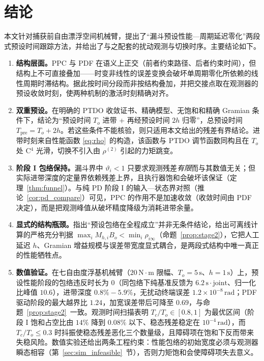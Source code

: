 \section{结论}
\label{sec:conclusion}

本文针对捕获前自由漂浮空间机械臂，提出了“漏斗预设性能—周期延迟零化”两段式预设时间跟踪方法，并给出了与之配套的扰动观测与切换时序。主要结论如下。

\begin{enumerate}
  \item \textbf{结构层面。}PPC 与 PDF 在语义上正交（前者约束路径、后者约束时间），但结构上不可直接叠加——时变非线性的误差变换会破坏单周期零化所依赖的线性周期时滞结构。据此按时间分段而非按结构叠加，并把交接点取在观测器的预设收敛时刻，使两种机制的激活时刻精确对齐。

  \item \textbf{双重预设。}在明确的 PTDO 收敛证书、精确模型、无饱和和精确 Gramian 条件下，结论为“预设时间 \(T_o\) 进带 + 再经预设时间 \(2h\) 归零”，总预设时间 \(T_{\mathrm{pre}}=T_o+2h\)。若这些条件不能核验，则只适用本文给出的残差有界结论。进带时刻来自性能函数 \eqref{eq:rho}~的构造，该函数与 PTDO 调节函数同构且在 \(T_o\) 处 C$^{4}$ 光滑，切换不引入由 \(\rho^{(2)}\) 引起的力矩跳变。

  \item \textbf{阶段 I 包络保持。}漏斗界中 \(\vartheta_i<1\) 只要求观测残差\emph{有限}而与其数值无关；但实际进带深度的定量界依赖残差上界，且执行器饱和会破坏该保证（定理~\ref{thm:funnel}）。与纯 PD 阶段 I 的输入—状态界对照（推论~\ref{cor:pd_compare}）可见，PPC 的作用不是加速收敛（收敛时间由 PDF 决定），而是把观测峰值从破坏精度降级为消耗进带余量。

  \item \textbf{显式的结构瓶颈。}指出“预设包络在全程成立”并非无条件结论，给出可离线计算的严格充分判据 \(\max_iM_{h,i}B_o<\min_i\rho_{i\infty}\)（命题~\ref{prop:stage2}），它把人工延迟 \(h\)、Gramian 增益规模与误差带宽度显式耦合，是两段式结构中唯一真正的性能牺牲点。

  \item \textbf{数值验证。}在七自由度浮基机械臂（\(20\,\mathrm{N\cdot m}\) 限幅、\(T_o=5\,\mathrm{s}\)、\(h=1\,\mathrm{s}\)）上，预设性能阶段的包络违反时长为 \(0\)（同包络下纯基准反馈为 \(6.2\,\mathrm{s\cdot joint}\)、归一化比峰值 \(10.6\)），进带深度 \(0.8\%\!-\!5.9\%\)，无扰动终端误差 \(1.2\times10^{-8}\,\mathrm{rad}\)；PDF 驱动阶段的最大越界比 \(1.24\)，加宽误差带后可降至 \(0.69\)，与命题~\ref{prop:stage2}~一致。观测时间扫描表明 \(T_c/T_o\in[0.8,1]\) 为最优区间（阶段 I 饱和占空比由 \(14\%\) 降到 \(0.08\%\) 以下、稳态残差稳定在 \(10^{-4}\,\mathrm{rad}\)），而 \(T_c/T_o\le0.3\) 时抖振使稳态残差恶化三个数量级，且障碍项在饱和下反而带来失稳风险。数值实验还给出两条工程约束：性能包络的初始宽度必须与观测器瞬态相容（第~\ref{sec:sim_infeasible}~节），否则力矩饱和会使障碍项失去意义。


\end{enumerate}
